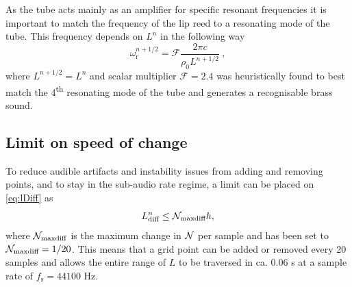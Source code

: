 As the tube acts mainly as an amplifier for specific resonant frequencies it is important to match the frequency of the lip reed to a resonating mode of the tube. This frequency depends on $L^n$ in the following way
\begin{equation}\label{eq:lipReedCalc}
    \omega_\text{r}^{n+1/2} = \mathcal{F}\frac{2\pi c}{\rho_0 L^{n+1/2}}\ ,
\end{equation}
where $L^{n+1/2} = L^n$ and scalar multiplier $\mathcal{F} = 2.4$ was heuristically found to best match the 4\textsuperscript{th} resonating mode of the tube and generates a recognisable brass sound.

\subsection{Limit on speed of change}\label{sec:limit}
To reduce audible artifacts and instability issues from adding and removing points, and to stay in the sub-audio rate regime, a limit can be placed on \eqref{eq:lDiff} as
\begin{equation}\label{eq:Nmaxdiff} 
    L_\text{diff}^n \leq \mathcal{N}_\text{maxdiff} h,
\end{equation}
where $\mathcal{N}_\text{maxdiff}$ is the maximum change in $\mathcal{N}$ per sample and has been set to $\mathcal{N}_\text{maxdiff} = 1/20$. This means that a grid point can be added or removed every 20 samples and allows the entire range of $L$ to be traversed in ca. 0.06 s at a sample rate of $f_\text{s} = 44100$ Hz.

